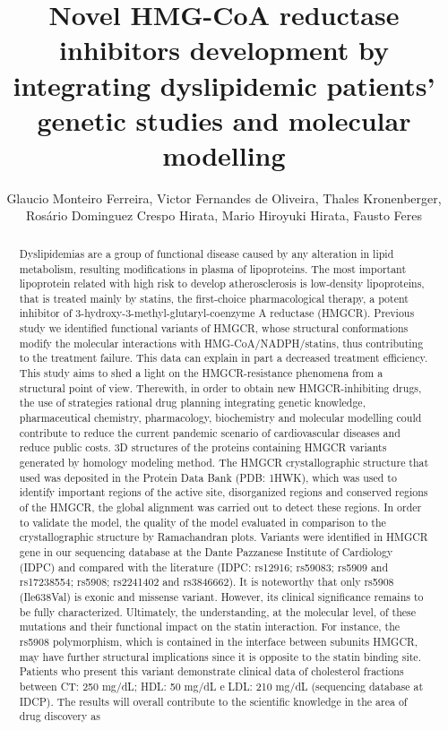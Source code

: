 \documentclass[twoside]{article}
\title{\vspace{-15mm}\fontsize{24pt}{10pt}\selectfont\textbf{ Novel HMG-CoA reductase inhibitors development by integrating dyslipidemic patients’ genetic studies and molecular modelling }} %
\author{ Glaucio Monteiro Ferreira, Victor Fernandes de Oliveira, Thales Kronenberger, Ros\'ario Dominguez Crespo Hirata, Mario Hiroyuki Hirata, Fausto Feres }
\affil{ Laboratory of Molecular Research in Cardiology (LIMC),  Dante Pazzanese Institute of Cardiology,  S\~ao Paulo,  Brazil. }
\date{}
\begin{document}
  
  
  \maketitle %
  
  
  \thispagestyle{fancy} %
  
  
  \begin{abstract}
  Dyslipidemias are a group of functional disease caused by any alteration in lipid metabolism,  resulting modifications in plasma of lipoproteins. The most important lipoprotein related with high risk to develop atherosclerosis is low-density lipoproteins,  that is treated mainly by statins,  the first-choice pharmacological therapy,  a potent inhibitor of 3-hydroxy-3-methyl-glutaryl-coenzyme A reductase (HMGCR). Previous study we identified functional variants of HMGCR,  whose structural conformations modify the molecular interactions with HMG-CoA/NADPH/statins,  thus contributing to the treatment failure. This data can explain in part a decreased treatment efficiency. This study aims to shed a light on the HMGCR-resistance phenomena from a structural point of view. Therewith,  in order to obtain new HMGCR-inhibiting drugs,  the use of strategies rational drug planning integrating genetic knowledge,  pharmaceutical chemistry,  pharmacology,  biochemistry and molecular modelling could contribute to reduce the current pandemic scenario of cardiovascular diseases and reduce public costs. 3D structures of the proteins containing HMGCR variants generated by homology modeling method. The HMGCR crystallographic structure that used was deposited in the Protein Data Bank (PDB: 1HWK),  which was used to identify important regions of the active site,  disorganized regions and conserved regions of the HMGCR,  the global alignment was carried out to detect these regions. In order to validate the model,  the quality of the model evaluated in comparison to the crystallographic structure by Ramachandran plots. Variants were identified in HMGCR gene in our sequencing database at the Dante Pazzanese Institute of Cardiology (IDPC) and compared with the literature (IDPC: rs12916; rs59083; rs5909 and rs17238554; rs5908; rs2241402 and rs3846662). It is noteworthy that only rs5908 (Ile638Val) is exonic and missense variant. However,  its clinical significance remains to be fully characterized. Ultimately,  the understanding,  at the molecular level,  of these mutations and their functional impact on the statin interaction. For instance,  the rs5908 polymorphism,  which is contained in the interface between subunits HMGCR,  may have further structural implications since it is opposite to the statin binding site. Patients who present this variant demonstrate clinical data of cholesterol fractions between CT: 250 mg/dL; HDL: 50 mg/dL e LDL: 210 mg/dL (sequencing database at IDCP). The results will overall contribute to the scientific knowledge in the area of drug discovery as 
\end{abstract}
\end{document}
